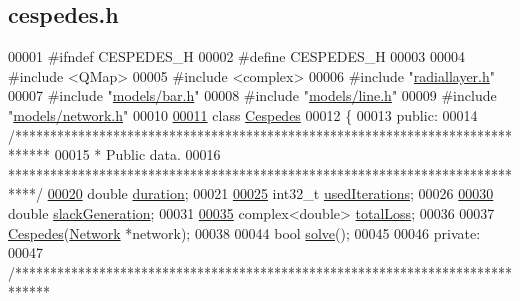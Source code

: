 \hypertarget{cespedes_8h_source}{}\subsection{cespedes.\+h}
\label{cespedes_8h_source}

\begin{DoxyCode}
00001 \textcolor{preprocessor}{#ifndef CESPEDES\_H}
00002 \textcolor{preprocessor}{#define CESPEDES\_H}
00003 
00004 \textcolor{preprocessor}{#include <QMap>}
00005 \textcolor{preprocessor}{#include <complex>}
00006 \textcolor{preprocessor}{#include "\hyperlink{radiallayer_8h}{radiallayer.h}"}
00007 \textcolor{preprocessor}{#include "\hyperlink{bar_8h}{models/bar.h}"}
00008 \textcolor{preprocessor}{#include "\hyperlink{line_8h}{models/line.h}"}
00009 \textcolor{preprocessor}{#include "\hyperlink{network_8h}{models/network.h}"}
00010 
\hypertarget{cespedes_8h_source_l00011}{}\hyperlink{class_cespedes}{00011} \textcolor{keyword}{class }\hyperlink{class_cespedes}{Cespedes}
00012 \{
00013 \textcolor{keyword}{public}:
00014   \textcolor{comment}{/*****************************************************************************}
00015 \textcolor{comment}{    * Public data.}
00016 \textcolor{comment}{    ****************************************************************************/}
\hypertarget{cespedes_8h_source_l00020}{}\hyperlink{class_cespedes_a815e35adbc446c937d164186a634b5a0}{00020}   \textcolor{keywordtype}{double} \hyperlink{class_cespedes_a815e35adbc446c937d164186a634b5a0}{duration};
00021 
\hypertarget{cespedes_8h_source_l00025}{}\hyperlink{class_cespedes_a28bead7e9c77462986e1471c50294d9e}{00025}   int32\_t \hyperlink{class_cespedes_a28bead7e9c77462986e1471c50294d9e}{usedIterations};
00026 
\hypertarget{cespedes_8h_source_l00030}{}\hyperlink{class_cespedes_a74591c697b8b471f6c0450a561d30591}{00030}   \textcolor{keywordtype}{double} \hyperlink{class_cespedes_a74591c697b8b471f6c0450a561d30591}{slackGeneration};
00031 
\hypertarget{cespedes_8h_source_l00035}{}\hyperlink{class_cespedes_ae1a95c3c22fff9c230fd528d9b191966}{00035}   complex<double> \hyperlink{class_cespedes_ae1a95c3c22fff9c230fd528d9b191966}{totalLoss};
00036 
00037   \hyperlink{class_cespedes_ad0b43c0c5ea7935c8dcb4dcf3d79ff7c}{Cespedes}(\hyperlink{class_network}{Network} *network);
00038 
00044   \textcolor{keywordtype}{bool} \hyperlink{class_cespedes_a067d624d68effc0eced09b18f2a16fc0}{solve}();
00045 
00046 \textcolor{keyword}{private}:
00047   \textcolor{comment}{/*****************************************************************************}

\end{DoxyCode}
